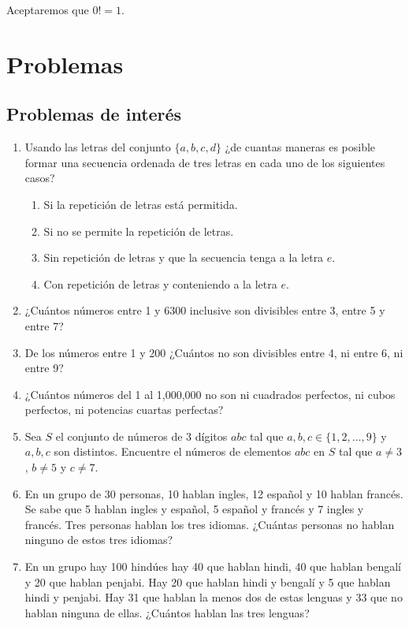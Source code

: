Aceptaremos que $0!=1$.

\section*{Problemas}

\subsection*{Problemas de interés}

\begin{enumerate}
    \item Usando las letras del conjunto $\{a,b,c,d\}$ ¿de cuantas maneras es posible formar una secuencia ordenada de tres letras en cada uno de los siguientes casos?
    \begin{enumerate}
        \item Si la repetición de letras está permitida.
        \item Si no se permite la repetición de letras.
        \item Sin repetición de letras y que la secuencia tenga a la letra $e$.
        \item Con repetición de letras y conteniendo a la letra $e$.
    \end{enumerate}
    \item ¿Cuántos números entre 1 y 6300 inclusive son divisibles entre 3, entre 5 y entre 7?
    \item De los números entre 1 y 200 ¿Cuántos no son divisibles entre 4, ni entre 6, ni entre 9?
    \item ¿Cuántos números del 1 al 1,000,000 no son ni cuadrados perfectos, ni cubos perfectos, ni potencias cuartas perfectas?
    \item Sea $S$ el conjunto de números de 3 dígitos $abc$ tal que $a,b,c\in \{1,2,\dots,9\}$ y $a,b,c$ son distintos. Encuentre el números de elementos $abc$ en $S$ tal que $a\not=3$, $b\not=5$ y $c\not=7$.
    \item En un grupo de 30 personas, 10 hablan ingles, 12 español y 10 hablan francés. Se sabe que 5 hablan ingles y español, 5 español y francés y 7 ingles y francés. Tres personas hablan los tres idiomas. ¿Cuántas personas no hablan ninguno de estos tres idiomas?
    \item En un grupo hay 100 hindúes hay 40 que hablan hindi, 40 que hablan bengalí y 20 que hablan penjabi. Hay 20 que hablan hindi y bengalí y 5 que hablan hindi y penjabi. Hay 31 que hablan la menos dos de estas lenguas y 33 que no hablan ninguna de ellas. ¿Cuántos hablan las tres lenguas?

\end{enumerate}
